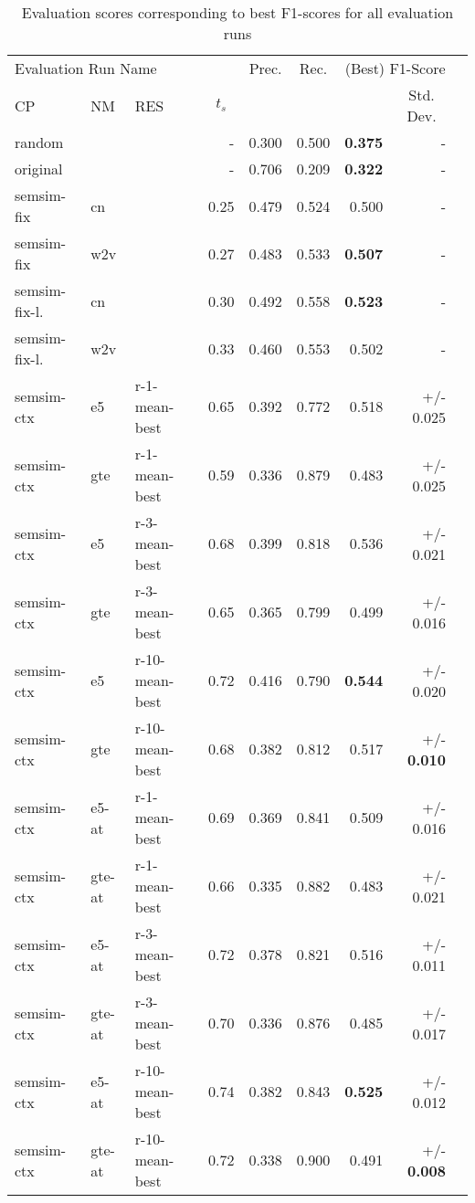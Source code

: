 \documentclass[11pt]{scrreprt}
\begin{document}
\begin{table}
\centering
\begin{tabular}{lllrrrrrr}
\toprule
\multicolumn{4}{l}{Evaluation Run Name} & \multicolumn{1}{c}{Prec.} & \multicolumn{1}{c}{Rec.} & \multicolumn{2}{c}{(Best) F1-Score}\\
\cmidrule{1-4}\cmidrule{7-8}
\multicolumn{1}{l}{CP} & \multicolumn{1}{l}{NM} & \multicolumn{1}{l}{RES} & \multicolumn{1}{c}{\(t_s\)} & \multicolumn{3}{l}{} & \multicolumn{1}{c}{Std. Dev.} \\
\midrule
random &  &  & - & 0.300 & 0.500 & \textbf{0.375} & - \\
\hline
original &  &  & - & 0.706 & 0.209 & \textbf{0.322} & - \\
\hline
semsim-fix & cn &  & 0.25 & 0.479 & 0.524 & 0.500 & - \\
semsim-fix & w2v &  & 0.27 & 0.483 & 0.533 & \textbf{0.507} & - \\
\hline
semsim-fix-l. & cn &  & 0.30 & 0.492 & 0.558 & \textbf{0.523} & - \\
semsim-fix-l. & w2v &  & 0.33 & 0.460 & 0.553 & 0.502 & - \\
\hline
semsim-ctx & e5 & r-1-mean-best & 0.65 & 0.392 & 0.772 & 0.518 & +/- 0.025 \\
semsim-ctx & gte & r-1-mean-best & 0.59 & 0.336 & 0.879 & 0.483 & +/- 0.025 \\
semsim-ctx & e5 & r-3-mean-best & 0.68 & 0.399 & 0.818 & 0.536 & +/- 0.021 \\
semsim-ctx & gte & r-3-mean-best & 0.65 & 0.365 & 0.799 & 0.499 & +/- 0.016 \\
semsim-ctx & e5 & r-10-mean-best & 0.72 & 0.416 & 0.790 & \textbf{0.544} & +/- 0.020 \\
semsim-ctx & gte & r-10-mean-best & 0.68 & 0.382 & 0.812 & 0.517 & +/- \textbf{0.010} \\

\hline
semsim-ctx & e5-at & r-1-mean-best & 0.69 & 0.369 & 0.841 & 0.509 & +/- 0.016 \\
semsim-ctx & gte-at & r-1-mean-best & 0.66 & 0.335 & 0.882 & 0.483 & +/- 0.021 \\
semsim-ctx & e5-at & r-3-mean-best & 0.72 & 0.378 & 0.821 & 0.516 & +/- 0.011 \\
semsim-ctx & gte-at & r-3-mean-best & 0.70 & 0.336 & 0.876 & 0.485 & +/- 0.017 \\
semsim-ctx & e5-at & r-10-mean-best & 0.74 & 0.382 & 0.843 & \textbf{0.525} & +/- 0.012 \\
semsim-ctx & gte-at & r-10-mean-best & 0.72 & 0.338 & 0.900 & 0.491 & +/- \textbf{0.008} \\
\bottomrule
\end{tabular}
\caption{Evaluation scores corresponding to best F1-scores for all evaluation runs}
\label{tab:best-f1-score-mean-best}
\end{table}
\end{document}
